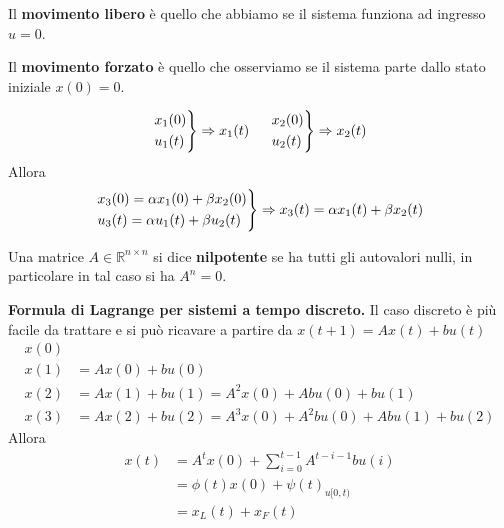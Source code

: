 \documentclass[10pt,a4paper]{book}
\begin{document}
Il \textbf{movimento libero} è quello che abbiamo se il sistema funziona ad ingresso $u=0$.

Il \textbf{movimento forzato} è quello che osserviamo se il sistema parte dallo stato iniziale $x( 0) =0$.
\begin{theorem}
\begin{equation*}
\begin{drcases}
x_{1}( 0)\\
u_{1}( t)
\end{drcases} \Rightarrow x_{1}( t) \ \ \ \ \begin{drcases}
x_{2}( 0)\\
u_{2}( t)
\end{drcases} \Rightarrow x_{2}( t)
\end{equation*}
Allora
\begin{equation*}
\begin{drcases}
x_{3}( 0) =\alpha x_{1}( 0) +\beta x_{2}( 0)\\
u_{3}( t) =\alpha u_{1}( t) +\beta u_{2}( t)
\end{drcases} \Rightarrow x_{3}( t) =\alpha x_{1}( t) +\beta x_{2}( t)
\end{equation*}
\end{theorem}
\begin{ricalg}
Una matrice $A\in \mathbb{R}^{n\times n}$ si dice \textbf{nilpotente} se ha tutti gli autovalori nulli, in particolare in tal caso si ha $A^{n} =0$.
\end{ricalg}
\textbf{Formula di Lagrange per sistemi a tempo discreto.} Il caso discreto è più facile da trattare e si può ricavare a partire da $x(t+1)=Ax(t)+bu(t)$
\begin{equation*}
\begin{aligned}
x( 0) & \\
x( 1) & =Ax( 0) +bu( 0)\\
x( 2) & =Ax( 1) +bu( 1) =A^{2} x( 0) +Abu( 0) +bu( 1)\\
x( 3) & =Ax( 2) +bu( 2) =A^{3} x( 0) +A^{2} bu( 0) +Abu( 1) +bu( 2)
\end{aligned}
\end{equation*}
Allora
\begin{equation}
\boxed{\begin{aligned}
x( t) & =A^{t} x( 0) +\sum\limits ^{t-1}_{i=0} A^{t-i-1} bu( i)\\
 & =\phi ( t) x( 0) +\psi ( t)_{u[ 0,t)}\\
 & =x_{L}( t) +x_{F}( t)
\end{aligned}}
\end{equation}
\end{document}
